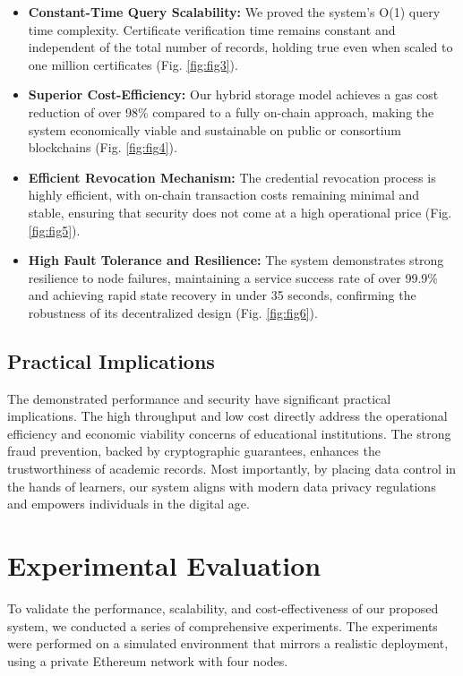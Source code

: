\documentclass[lettersize,journal]{IEEEtran}
\begin{document}
\begin{itemize}
\begin{itemize}
    \item \textbf{Constant-Time Query Scalability:} We proved the system's O(1) query time complexity. Certificate verification time remains constant and independent of the total number of records, holding true even when scaled to one million certificates (Fig. \ref{fig:fig3}).

    \item \textbf{Superior Cost-Efficiency:} Our hybrid storage model achieves a gas cost reduction of over 98\% compared to a fully on-chain approach, making the system economically viable and sustainable on public or consortium blockchains (Fig. \ref{fig:fig4}).

    \item \textbf{Efficient Revocation Mechanism:} The credential revocation process is highly efficient, with on-chain transaction costs remaining minimal and stable, ensuring that security does not come at a high operational price (Fig. \ref{fig:fig5}).

    \item \textbf{High Fault Tolerance and Resilience:} The system demonstrates strong resilience to node failures, maintaining a service success rate of over 99.9\% and achieving rapid state recovery in under 35 seconds, confirming the robustness of its decentralized design (Fig. \ref{fig:fig6}).
\end{itemize}

\subsection{Practical Implications}
The demonstrated performance and security have significant practical implications. The high throughput and low cost directly address the operational efficiency and economic viability concerns of educational institutions. The strong fraud prevention, backed by cryptographic guarantees, enhances the trustworthiness of academic records. Most importantly, by placing data control in the hands of learners, our system aligns with modern data privacy regulations and empowers individuals in the digital age.

\section{Experimental Evaluation}
To validate the performance, scalability, and cost-effectiveness of our proposed system, we conducted a series of comprehensive experiments. The experiments were performed on a simulated environment that mirrors a realistic deployment, using a private Ethereum network with four nodes.


\end{itemize}
\end{document}

